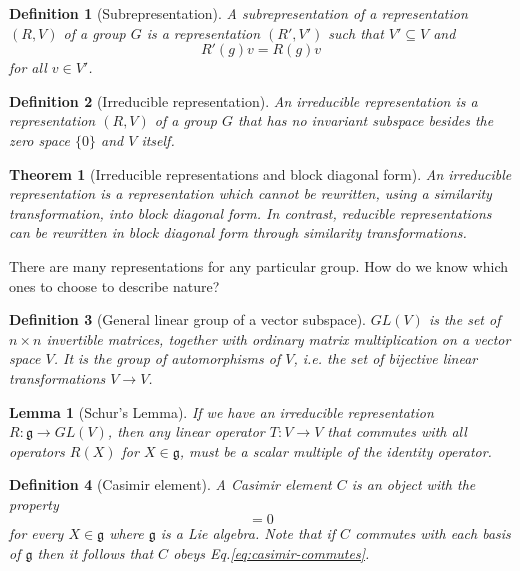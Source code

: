 \documentclass[11pt]{article}
\numberwithin{equation}{section}
\newtheorem{thm}{Theorem}[section]
\newtheorem{defn}{Definition}[section]
\newtheorem{lma}{Lemma}[section]
\begin{document}
\begin{defn}[Subrepresentation]
A subrepresentation of a representation $(R, V)$ of a group $G$ is a representation $(R', V')$ such that $V' \subseteq V$ and 
\begin{equation}
R'(g)v = R(g)v
\end{equation}
for all $v \in V'$.
\end{defn}

\begin{defn}[Irreducible representation]
An irreducible representation is a representation $(R, V)$ of a group $G$ that has no invariant subspace besides the zero space $\{0\}$ and $V$ itself.
\end{defn}

\begin{thm}[Irreducible representations and block diagonal form]
An irreducible representation is a representation which cannot be rewritten, using a similarity transformation, into block diagonal form. In contrast, reducible representations can be rewritten in block diagonal form through similarity transformations.
\end{thm}

There are many representations for any particular group. How do we know which ones to choose to describe nature?

\begin{defn}[General linear group of a vector subspace]
$GL(V)$ is the set of $n\times n$ invertible matrices, together with ordinary matrix multiplication on a vector space $V$. It is the group of automorphisms of $V$, i.e. the set of bijective linear transformations $V \rightarrow V$. 
\end{defn}

\begin{lma}[Schur's Lemma]
If we have an irreducible representation $R: \mathfrak{g} \rightarrow GL(V)$, then any linear operator $T : V \rightarrow V$ that commutes with all operators $R(X)$ for $X \in \mathfrak{g}$, must be a scalar multiple of the identity operator.
\end{lma}

\begin{defn}[Casimir element]
A Casimir element $C$ is an object with the property
\begin{equation}
[C, X] = 0 \label{eq:casimir-commutes}
\end{equation}
for every $X \in \mathfrak{g}$ where $\mathfrak{g}$ is a Lie algebra. Note that if $C$ commutes with each basis of $\mathfrak{g}$ then it follows that $C$ obeys Eq.\eqref{eq:casimir-commutes}.
\end{defn}
\end{document}
